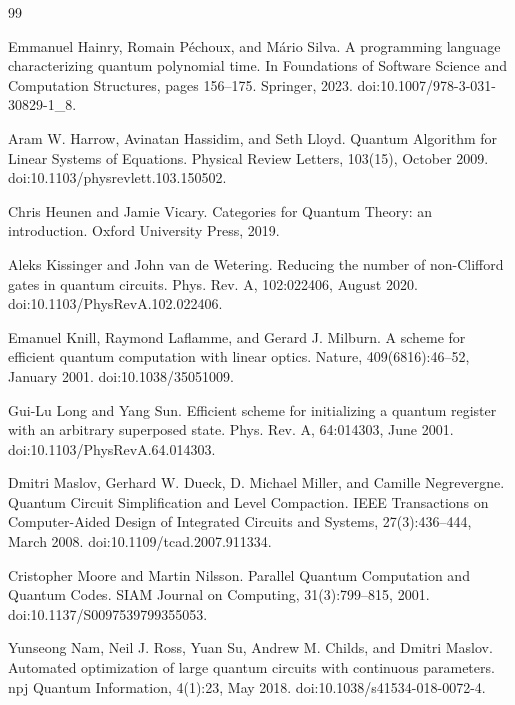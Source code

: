 \documentclass[10pt,a4paper]{amsart}
\begin{document}
\begin{thebibliography}{99}
\par\noindent  [17]  Emmanuel Hainry, Romain Péchoux, and Mário Silva.  A programming language characterizing quantum polynomial time.  In Foundations of Software Science and Computation Structures, pages 156–175. Springer, 2023.  doi:10.1007/978-3-031-30829-1\_8.  
 
\par\noindent  [18]  Aram W. Harrow, Avinatan Hassidim, and Seth Lloyd.  Quantum Algorithm for Linear Systems of Equations.  Physical Review Letters, 103(15), October 2009.  doi:10.1103/physrevlett.103.150502.  
 
\par\noindent  [19]  Chris Heunen and Jamie Vicary.  Categories for Quantum Theory: an introduction.  Oxford University Press, 2019.  
 
\par\noindent  [20]  Aleks Kissinger and John van de Wetering.  Reducing the number of non-Clifford gates in quantum circuits.  Phys. Rev. A, 102:022406, August 2020.  doi:10.1103/PhysRevA.102.022406.  
 
\par\noindent  [21]  Emanuel Knill, Raymond Laflamme, and Gerard J. Milburn.  A scheme for efficient quantum computation with linear optics.  Nature, 409(6816):46–52, January 2001.  doi:10.1038/35051009.  
 
\par\noindent  [22]  Gui-Lu Long and Yang Sun.  Efficient scheme for initializing a quantum register with an arbitrary superposed state.  Phys. Rev. A, 64:014303, June 2001.  doi:10.1103/PhysRevA.64.014303.  
 
\par\noindent  [23]  Dmitri Maslov, Gerhard W. Dueck, D. Michael Miller, and Camille Negrevergne.  Quantum Circuit Simplification and Level Compaction.  IEEE Transactions on Computer-Aided Design of Integrated Circuits and Systems, 27(3):436–444, March 2008.  doi:10.1109/tcad.2007.911334.  
 
\par\noindent  [24]  Cristopher Moore and Martin Nilsson.  Parallel Quantum Computation and Quantum Codes.  SIAM Journal on Computing, 31(3):799–815, 2001.  doi:10.1137/S0097539799355053.  
 
\par\noindent  [25]  Yunseong Nam, Neil J. Ross, Yuan Su, Andrew M. Childs, and Dmitri Maslov.  Automated optimization of large quantum circuits with continuous parameters.  npj Quantum Information, 4(1):23, May 2018.  doi:10.1038/s41534-018-0072-4.  
 

\end{thebibliography}
\end{document}
